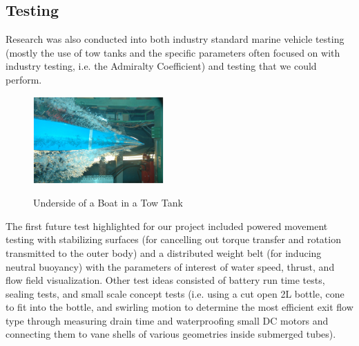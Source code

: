 \documentclass{report}
\begin{document}
\subsection{Testing}
Research was also conducted into both industry standard marine vehicle testing (mostly the use of tow tanks and the specific parameters often focused on with industry testing, i.e. the Admiralty Coefficient) and testing that we could perform. \par
\begin{figure}[h]
\centering
\includegraphics[width=5cm]{"Test Tank"}
\caption{Underside of a Boat in a Tow Tank}
\cite{TowTank}
\end{figure}
The first future test highlighted for our project included powered movement testing with stabilizing surfaces (for cancelling out torque transfer and rotation transmitted to the outer body) and a distributed weight belt (for inducing neutral buoyancy) with the parameters of interest of water speed, thrust, and flow field visualization.  Other test ideas consisted of battery run time tests, sealing tests, and small scale concept tests (i.e. using a cut open 2L bottle, cone to fit into the bottle, and swirling motion to determine the most efficient exit flow type through measuring drain time and waterproofing small DC motors and connecting them to vane shells of various geometries inside submerged tubes).
\end{document}
